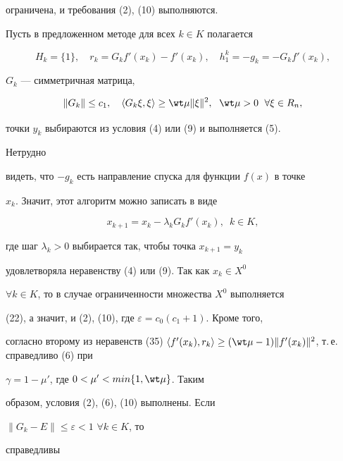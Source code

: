 ограничена, и требования (2), (10) выполняются.





Пусть в предложенном методе для всех $k\in K$ полагается


$$


H_k=\{ {1} \},\quad r_k=G_k{f}'(x_k)-{f}'(x_k),\quad h^k_1=


-g_k=-G_k{f}'(x_k),


$$


$G_k $ --- симметричная матрица,


\begin{equation}


\|G_k\| \leq c_1,\quad \langle G_k\xi,\xi \rangle \geq \wt \mu 


\|\xi\|^2,\ \; \wt \mu >0\ \; \forall \xi \in R_n,


\end{equation}


точки $y_k$ выбираются из условия (4) или (9) и выполняется (5). 


Нетрудно


видеть, что $-g_k$ есть направление спуска для функции $f(x)$ в точке


$x_k$. Значит, этот алгоритм можно записать в виде


\begin{equation}


x_{k+1}=x_k-\lambda_kG_k{f}'(x_k),\ \; k\in K,


\end{equation}


где шаг $\lambda_k>0$ выбирается так, чтобы точка $x_{k+1}=y_k$ 


удовлетворяла неравенству (4) или (9). Так как $x_k\in X^0$


$\forall k\in K$, то в случае ограниченности множества $X^0$ выполняется


(22), а значит, и (2), (10), где $\varepsilon =c_0(c_1+1)$. Кроме того,


согласно второму из неравенств (35) $\langle f'(x_k),r_k\rangle \geq 


(\wt\mu -1)\|f'(x_k)\|^2$, т.\,е.{} справедливо (6) при


$\gamma =1-{\mu }'$, где $0<{\mu }'<min\{1,\wt \mu\}$. Таким


образом, условия (2), (6), (10) выполнены. Если


$\|G_k-E\| \leq \varepsilon <1$ $\forall k\in K$, то 


справедливы


